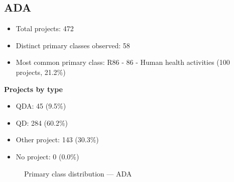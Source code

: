 \subsection{ADA}

\begin{itemize}
    \item Total projects: 472
    \item Distinct primary classes observed: 58
    \item Most common primary class: R86 - 86 - Human health activities (100 projects, 21.2\%)
\end{itemize}
\textbf{Projects by type}
\begin{itemize}
    \item QDA: 45 (9.5\%)
    \item QD: 284 (60.2\%)
    \item Other project: 143 (30.3\%)
    \item No project: 0 (0.0\%)
\end{itemize}

\begin{figure}[H]
    \centering
    
    \caption{Primary class distribution --- ADA}
\end{figure}

